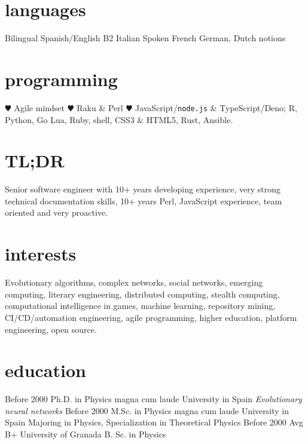 \documentclass[]{friggeri-jj-cv}
\begin{document}
\begin{aside}
  \section{languages}
    Bilingual Spanish/English
    B2 Italian
    Spoken French
    German, Dutch notions
  \section{programming}
  {\color{red} \large $\varheartsuit$} Agile mindset
  {\color{red} $\varheartsuit$} Raku \& Perl
  {\color{red} $\varheartsuit$} JavaScript/{\tt node.js} \& TypeScript/Deno;
  R, Python, Go
    Lua, Ruby, shell, CSS3 \& HTML5, Rust, Ansible.
  \end{aside}

\section{TL;DR}

Senior software engineer with 10+ years developing experience, very strong
technical documentation skills, 10+ years Perl, JavaScript experience, team oriented and
very proactive.

\section{interests}

Evolutionary algorithms, complex networks, social networks, emerging
computing, literary engineering, distributed computing, stealth
computing, computational intelligence in games, machine learning,
repository mining, CI/CD/automation engineering, agile programming,
higher education, platform engineering, open source.

\section{education}

\begin{entrylist}
  \entry
    {Before 2000}
    {Ph.D. {\normalfont in Physics} magna cum laude}
    {University in Spain}
    {\emph{Evolutionary neural networks}}
  \entry
    {Before 2000}
    {M.Sc. {\normalfont in Physics} magna cum laude}
    {University in Spain}
    {Majoring in Physics, Specialization in Theoretical Physics}
  \entry
    {Before 2000}
    {Avg B+}
    {University of Granada}
    {B. Sc. in Physics}
\end{entrylist}
\end{document}
